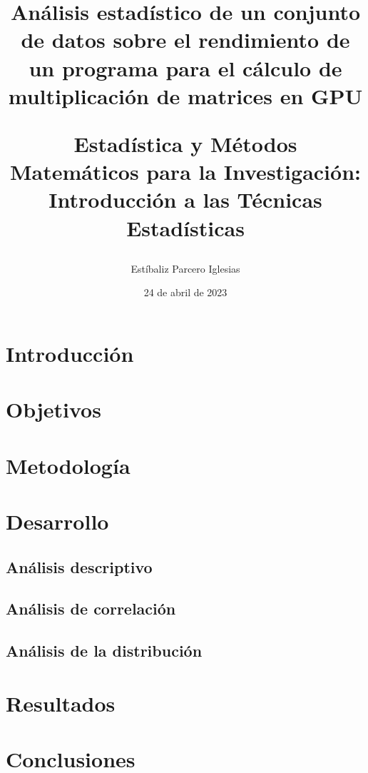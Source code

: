 \documentclass[11pt]{article}
\title{
  Análisis estadístico de un conjunto de datos sobre el rendimiento de un programa para el cálculo de multiplicación de matrices en GPU 
  
  \large
  \hfill \break
  Estadística y Métodos Matemáticos para la Investigación: Introducción a las Técnicas Estadísticas
}
\author{Estíbaliz Parcero Iglesias }
\date{24 de abril de 2023}
\begin{document}

\maketitle

\section{Introducción}


\section{Objetivos}


\section{Metodología}


\section{Desarrollo}
\subsection{Análisis descriptivo}

\subsection{Análisis de correlación}

\subsection{Análisis de la distribución}


\section{Resultados}


\section{Conclusiones}




\end{document}
